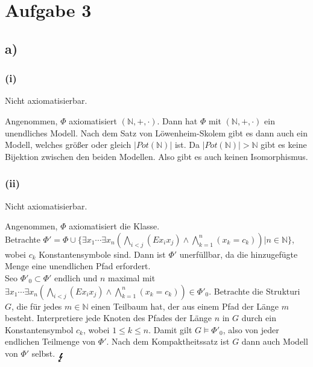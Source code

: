 \documentclass[11pt, a4paper]{article}
\newcommand{\n}{\wedge}
\begin{document}
\section*{Aufgabe 3}

\subsection*{a)}
\subsubsection*{(i)}
Nicht axiomatisierbar.

Angenommen, $\Phi$ axiomatisiert $(\mathbb{N},+,\cdot)$.
Dann hat $\Phi$ mit $(\mathbb{N},+,\cdot)$ ein unendliches Modell.
Nach dem Satz von Löwenheim-Skolem gibt es dann auch ein Modell, welches größer oder gleich $|Pot(\mathbb{N})|$ ist.
Da $|Pot(\mathbb{N})| > \mathbb{N}$ gibt es keine Bijektion zwischen den beiden Modellen.
Also gibt es auch keinen Isomorphismus.

\subsubsection*{(ii)}

Nicht axiomatisierbar.

Angenommen, $\Phi$ axiomatisiert die Klasse. \\
Betrachte $\Phi' = \Phi \cup \{ \exists x_1 \cdots \exists x_n (\bigwedge_{i < j} (Ex_ix_j) \n \bigwedge_{k=1}^{n} (x_k=c_k)) | n \in \mathbb{N}\}$, wobei $c_k$ Konstantensymbole sind.
Dann ist $\Phi'$ unerfüllbar, da die hinzugefügte Menge eine unendlichen Pfad erfordert. \\
Seo $\Phi'_0 \subset \Phi'$ endlich und $n$ maximal mit $\exists x_1 \cdots \exists x_n (\bigwedge_{i < j} (Ex_ix_j) \n \bigwedge_{k=1}^{n} (x_k=c_k)) \in \Phi'_0$.
Betrachte die Strukturi $G$, die für jedes $m \in \mathbb{N}$ einen Teilbaum hat, der aus einem Pfad der Länge $m$ besteht.
Interpretiere jede Knoten des Pfades der Länge $n$ in $G$ durch ein Konstantensymbol $c_k$, wobei $1 \leq k \leq n$.
Damit gilt $G \models \Phi'_0$, also von jeder endlichen Teilmenge von $\Phi'$.
Nach dem Kompaktheitssatz ist $G$ dann auch Modell von $\Phi'$ selbst. $\null_\text{\Large\Lightning}$
\end{document}
